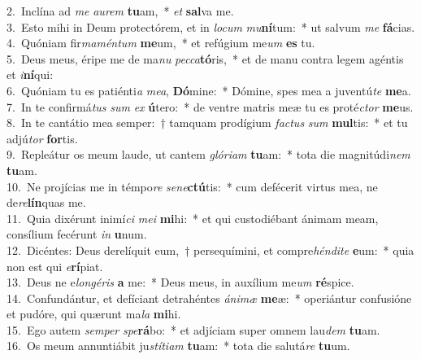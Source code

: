 {2.~}Inclína ad \textit{me} \textit{au}\textit{rem} \textbf{tu}am,~* \textit{et} \textbf{sal}va me.\\
{3.~}Esto mihi in Deum protectórem, et in \textit{lo}\textit{cum} \textit{mu}\textbf{ní}tum:~* ut salvum \textit{me} \textbf{fá}cias.\\
{4.~}Quóniam fir\textit{ma}\textit{mén}\textit{tum} \textbf{me}um,~* et refúgium me\textit{um} \textbf{es} tu.\\
{5.~}Deus meus, éripe me de ma\textit{nu} \textit{pec}\textit{ca}\textbf{tó}ris,~* et de manu contra legem agéntis et \textit{i}\textbf{ní}qui:\\
{6.~}Quóniam tu es patiénti\textit{a} \textit{me}\textit{a}, \textbf{Dó}mine:~* Dómine, spes mea a juventú\textit{te} \textbf{me}a.\\
{7.~}In te confirmá\textit{tus} \textit{sum} \textit{ex} \textbf{ú}tero:~* de ventre matris meæ tu es proté\textit{ctor} \textbf{me}us.\\
{8.~}In te cantátio mea semper:~† tamquam prodígium \textit{fa}\textit{ctus} \textit{sum} \textbf{mul}tis:~* et tu adjú\textit{tor} \textbf{for}tis.\\
{9.~}Repleátur os meum laude, ut cantem \textit{gló}\textit{ri}\textit{am} \textbf{tu}am:~* tota die magnitúdi\textit{nem} \textbf{tu}am.\\
{10.~}Ne projícias me in témpo\textit{re} \textit{se}\textit{ne}\textbf{ctú}tis:~* cum defécerit virtus mea, ne de\textit{re}\textbf{lín}quas me.\\
{11.~}Quia dixérunt inimí\textit{ci} \textit{me}\textit{i} \textbf{mi}hi:~* et qui custodiébant ánimam meam, consílium fecérunt \textit{in} \textbf{u}num.\\
{12.~}Dicéntes: Deus derelíquit eum,~† persequímini, et compre\textit{hén}\textit{di}\textit{te} \textbf{e}um:~* quia non est qui \textit{e}\textbf{rí}piat.\\
{13.~}Deus ne e\textit{lon}\textit{gé}\textit{ris} \textbf{a} me:~* Deus meus, in auxílium me\textit{um} \textbf{ré}spice.\\
{14.~}Confundántur, et defíciant detrahéntes \textit{á}\textit{ni}\textit{mæ} \textbf{me}æ:~* operiántur confusióne et pudóre, qui quærunt ma\textit{la} \textbf{mi}hi.\\
{15.~}Ego autem \textit{sem}\textit{per} \textit{spe}\textbf{rá}bo:~* et adjíciam super omnem lau\textit{dem} \textbf{tu}am.\\
{16.~}Os meum annuntiábit ju\textit{stí}\textit{ti}\textit{am} \textbf{tu}am:~* tota die salutá\textit{re} \textbf{tu}um.\\

